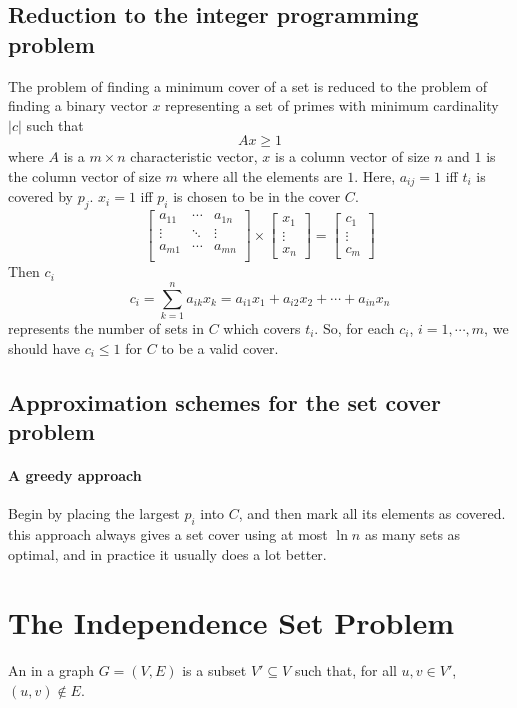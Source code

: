 \documentclass{note}
\begin{document}
\subsection{Reduction to the integer programming problem}
The problem of finding a minimum cover of a set is reduced
to the problem of finding a binary vector $x$ representing a set of
primes with minimum cardinality $|c|$ such that
\[ Ax \ge 1 \]
where $A$ is a $m\times n$ characteristic vector, $x$ is a column
vector of size $n$ and $1$ is the column vector of size $m$ where all the
elements are $1$.
Here, $a_{ij} = 1$ iff $t_i$ is covered by $p_j$.
$x_i = 1$ iff $p_i$ is chosen to be in the cover $C$.
\[ \left[\begin{array}{lll}
	a_{11} & \cdots & a_{1n} \\
	\vdots & \ddots  & \vdots \\
	a_{m1} & \cdots & a_{mn} \\
	 \end{array}\right] \times 
	\left[\begin{array}{l}
	x_1 \\ \vdots \\ x_n
	      \end{array}\right] =
	\left[\begin{array}{l}
	c_1 \\ \vdots \\ c_m
	      \end{array}\right]
\]
Then $c_i$
\[ c_i = \sum_{k=1}^n a_{ik}x_k = a_{i1}x_1 + a_{i2}x_2 + \cdots + a_{in}x_n\]
represents the number of sets in $C$ which covers $t_i$.
So, for each $c_i$, $i = 1, \cdots, m$, we should have $c_i \le 1$ for $C$
to be a valid cover.



\subsection{Approximation schemes for the set cover problem}
\paragraph{A greedy approach}
Begin by placing the largest $p_i$ into $C$, and then mark all its elements 
as covered. this approach always gives a set cover using at most $\ln n$
as many sets as optimal, and in practice it usually does a lot better.




\section{The Independence Set Problem}
An  in a graph $G = (V, E)$ is a subset $V' \subseteq V$
such that, for all $u, v \in V'$,  $(u, v) \not\in E$.
\end{document}
